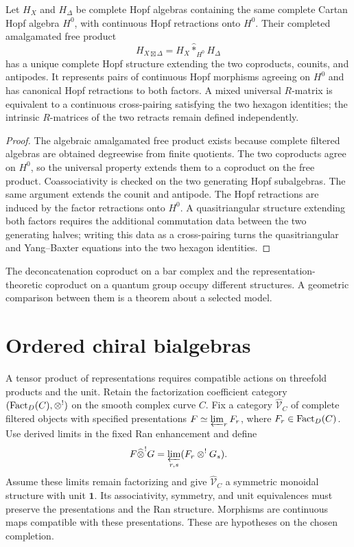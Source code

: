 \begin{theorem}
Let $H_X$ and $H_\Delta$ be complete Hopf algebras containing the same complete Cartan Hopf algebra $H^0$, with continuous Hopf retractions onto $H^0$.  Their completed amalgamated free product
\[
 H_{X\boxtimes\Delta}
 =H_X\widehat *_{H^0}H_\Delta
\]
has a unique complete Hopf structure extending the two coproducts, counits, and antipodes.  It represents pairs of continuous Hopf morphisms agreeing on $H^0$ and has canonical Hopf retractions to both factors.  A mixed universal $R$-matrix is equivalent to a continuous cross-pairing satisfying the two hexagon identities; the intrinsic $R$-matrices of the two retracts remain defined independently.
\end{theorem}
\begin{proof}
The algebraic amalgamated free product exists because complete filtered algebras are obtained degreewise from finite quotients.  The two coproducts agree on $H^0$, so the universal property extends them to a coproduct on the free product.  Coassociativity is checked on the two generating Hopf subalgebras.  The same argument extends the counit and antipode.  The Hopf retractions are induced by the factor retractions onto $H^0$.  A quasitriangular structure extending both factors requires the additional commutation data between the two generating halves; writing this data as a cross-pairing turns the quasitriangular and Yang--Baxter equations into the two hexagon identities.
\end{proof}

The deconcatenation coproduct on a bar complex and the representation-theoretic coproduct on a quantum group occupy different structures. A geometric comparison between them is a theorem about a selected model.

\chapter{Ordered chiral bialgebras}
A tensor product of representations requires compatible actions on
threefold products and the unit.
Retain the factorization coefficient category
$(\operatorname{Fact}_D(C),\otimes^!)$ on the smooth complex curve $C$.
Fix a category $\widehat{\mathcal V}_C$ of complete filtered objects
with specified presentations $F\simeq\varprojlim_r F_r$,
where $F_r\in\operatorname{Fact}_D(C)$.
Use derived limits in the fixed Ran enhancement and define
\[
 F\widehat{\otimes}^{!}G
 =\varprojlim_{r,s}(F_r\otimes^!G_s).
\]
Assume these limits remain factorizing and give
$\widehat{\mathcal V}_C$ a symmetric monoidal structure with unit $\mathbf1$.
Its associativity, symmetry, and unit equivalences must preserve
the presentations and the Ran structure.
Morphisms are continuous maps compatible with these presentations.
These are hypotheses on the chosen completion.

